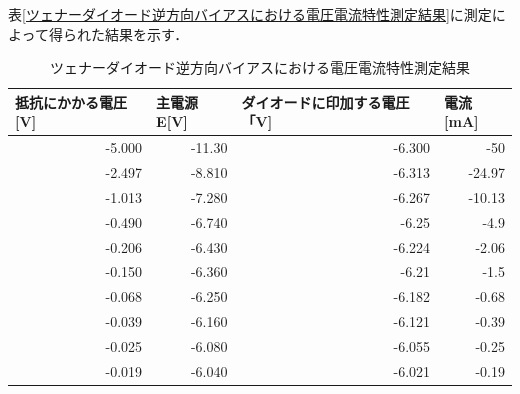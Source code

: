 \documentclass[titlepage]{jarticle}
\begin{document}
表\ref{ツェナーダイオード逆方向バイアスにおける電圧電流特性測定結果}に測定によって得られた結果を示す．
\begin{table}[htbp]
    \caption{ツェナーダイオード逆方向バイアスにおける電圧電流特性測定結果}
    \begin{center}
        \begin{tabular}{r|r|r|r}
            \hline\hline
            \multicolumn{1}{l|}{抵抗にかかる電圧[V]} & \multicolumn{1}{l|}{主電源E[V]} & \multicolumn{1}{l|}{ダイオードに印加する電圧「V]} & \multicolumn{1}{l}{電流[mA]} \\ \hline
            -5.000                                   & -11.30                          & -6.300                                            & -50                          \\ \hline
            -2.497                                   & -8.810                          & -6.313                                            & -24.97                       \\ \hline
            -1.013                                   & -7.280                          & -6.267                                            & -10.13                       \\ \hline
            -0.490                                   & -6.740                          & -6.25                                             & -4.9                         \\ \hline
            -0.206                                   & -6.430                          & -6.224                                            & -2.06                        \\ \hline
            -0.150                                   & -6.360                          & -6.21                                             & -1.5                         \\ \hline
            -0.068                                   & -6.250                          & -6.182                                            & -0.68                        \\ \hline
            -0.039                                   & -6.160                          & -6.121                                            & -0.39                        \\ \hline
            -0.025                                   & -6.080                          & -6.055                                            & -0.25                        \\ \hline
            -0.019                                   & -6.040                          & -6.021                                            & -0.19                        \\ \hline

\end{tabular}
\end{center}
\end{table}
\end{document}
